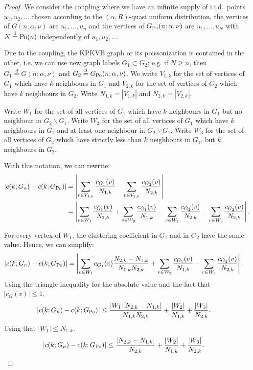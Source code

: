 \begin{proof}
We consider the coupling where we have an infinite supply of i.i.d.~points $u_1, u_2, \dots$ chosen according
to the $(\alpha,R)$-quasi uniform distribution, the vertices of $G(n;\alpha,\nu)$ are $u_1,\dots, u_n$ and 
the vertices of $G_{{\mathrm{Po}}}(n;\alpha,\nu)$ are $u_1,\dots, u_N$ with $N\stackrel{\text{d}}{=} {\mathrm{Po}}(n)$ independently of
$u_1, u_2, \dots$.

Due to the coupling, the KPKVB graph or its poissonization is contained in the other, i.e. we can use new graph labels $G_1 \subset G_2$; e.g. if $N\geq n$, then $G_1 \stackrel{d}{=} G(n;\alpha,\nu)$ and $G_2 \stackrel{d}{=} G_{{\mathrm{Po}}}(n;\alpha,\nu)$. We write $V_{1,k}$ for the set of vertices of $G_1$ which have $k$ neighbours in $G_1$ and $V_{2,k}$ for the set of vertices of $G_2$ which have $k$ neighbours in $G_2$. Write $N_{1,k}=|V_{1,k}|$ and $N_{2,k}=|V_{2,k}|$.

Write $W_1$ for the set of all vertices of $G_1$ which have $k$ neighbours in $G_1$ but no neighbour in $G_2 \backslash G_1$. Write $W_2$ for the set of all vertices of $G_1$ which have $k$ neighbours in $G_1$ and at least one neighbour in $G_2 \backslash G_1$. Write $W_3$ for the set of all vertices of $G_2$ which have strictly less than $k$ neighbours in $G_1$, but $k$ neighbours in $G_2$.

With this notation, we can rewrite:
\begin{align*}
|c(k;G_n)-c(k;G_{{\mathrm{Po}}})| &= \left|\sum_{v \in V_{1,k}}\frac{c_{G_1}(v)}{N_{1,k}}-\sum_{v \in V_{2,k}}\frac{c_{G_2}(v)}{N_{2,k}}\right| \\
&=\left|\sum_{v \in W_1}\frac{c_{G_1}(v)}{N_{1,k}}+\sum_{v \in W_2}\frac{c_{G_1}(v)}{N_{1,k}}-\sum_{v \in W_1}\frac{c_{G_2}(v)}{N_{2,k}}-\sum_{v \in W_3}\frac{c_{G_2}(v)}{N_{2,k}}\right|.
\end{align*}

For every vertex of $W_1$, the clustering coefficient in $G_1$ and in $G_2$ have the same value. Hence, we can simplify:
\begin{align*}
|c(k;G_n)-c(k;G_{{\mathrm{Po}}})| &= \left|\sum_{v \in W_1}c_{G_1}(v)\frac{N_{2,k}-N_{1,k}}{N_{1,k}N_{2,k}}+\sum_{v \in W_2}\frac{c_{G_1}(v)}{N_{1,k}}-\sum_{v \in W_3}\frac{c_{G_2}(v)}{N_{2,k}}\right|.
\end{align*}
Using the triangle inequality for the absolute value and the fact that $|c_G(v)|\leq 1$,
\begin{align*}
|c(k;G_n)-c(k;G_{{\mathrm{Po}}})| &\leq \frac{|W_1| |N_{2,k}-N_{1,k}|}{N_{1,k}N_{2,k}}+\frac{|W_2|}{N_{1,k}}+\frac{|W_3|}{N_{2,k}}.
\end{align*}
Using that $|W_1|\leq N_{1,k}$,
\begin{align*}
|c(k;G_n)-c(k;G_{{\mathrm{Po}}})| &\leq \frac{|N_{2,k}-N_{1,k}|}{N_{2,k}}+\frac{|W_2|}{N_{1,k}}+\frac{|W_3|}{N_{2,k}}.
\end{align*}


\end{proof}
